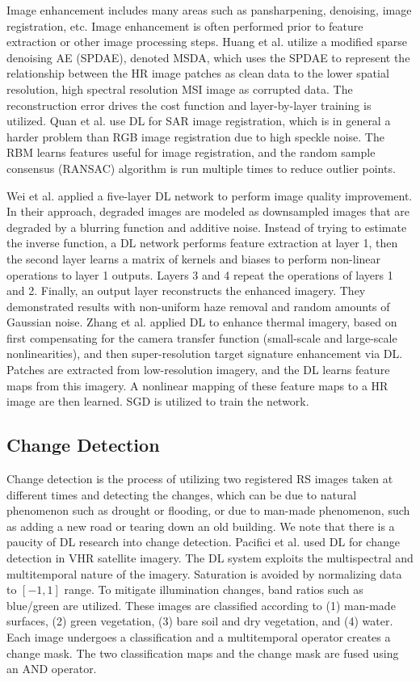 \documentclass[12pt]{spieman}
\begin{document}
\begin{spacing}{1}
Image enhancement includes many areas such as pansharpening, denoising, image registration, etc. Image enhancement is often performed prior to feature extraction or other image processing steps. Huang et al. \cite{huang2015new} utilize a modified sparse denoising AE (SPDAE), denoted MSDA, which uses the SPDAE to represent the relationship between the HR image patches as clean data to the lower spatial resolution, high spectral resolution MSI image as corrupted data. The reconstruction error drives the cost function and layer-by-layer training is utilized. Quan et al. \cite{Quan2016Using} use DL for SAR image registration, which is in general a harder problem than RGB image registration due to high speckle noise. The RBM learns features useful for image registration, and the random sample consensus (RANSAC) algorithm is run multiple times to reduce outlier points.

Wei et al. \cite{Wei2016Universal} applied a five-layer DL network to perform image quality improvement. In their approach, degraded images are modeled as downsampled images that are degraded by a blurring function and additive noise. Instead of trying to estimate the inverse function, a DL network performs feature extraction at layer 1, then the second layer learns a matrix of kernels and biases to perform non-linear operations to layer 1 outputs. Layers 3 and 4 repeat the operations of layers 1 and 2. Finally, an output layer reconstructs the enhanced imagery. They demonstrated results with non-uniform haze removal and random amounts of Gaussian noise. Zhang et al. \cite{zhang2016systematic} applied DL to enhance thermal imagery, based on first compensating for the camera transfer function (small-scale and large-scale nonlinearities), and then super-resolution target signature enhancement via DL. Patches are extracted from low-resolution imagery, and the DL learns feature maps from this imagery. A nonlinear mapping of these feature maps to a HR image are then learned. SGD is utilized to train the network.

\subsection{Change Detection}

Change detection is the process of utilizing two registered RS images taken at different times and detecting the changes, which can be due to natural phenomenon such as drought or flooding, or due to man-made phenomenon, such as adding a new road or tearing down an old building. We note that there is a paucity of DL research into change detection. Pacifici et al. \cite{Pacifici2007} used DL for change detection in VHR satellite imagery. The DL system exploits the multispectral and multitemporal nature of the imagery. Saturation is avoided by normalizing data to $[-1,1]$ range. To mitigate illumination changes, band ratios such as blue/green are utilized. These images are classified according to (1) man-made surfaces, (2) green vegetation, (3) bare soil and dry vegetation, and (4) water. Each image undergoes a classification and a multitemporal operator creates a change mask. The two classification maps and the change mask are fused using an AND operator.


\end{spacing}
\end{document}
